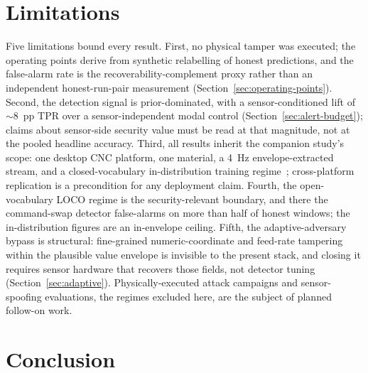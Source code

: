 \documentclass[sensors,article,submit,moreauthors,pdftex]{Definitions/mdpi}
\begin{document}
\section{Limitations}
\label{sec:limitations}

Five limitations bound every result. First, no physical tamper was executed; the operating points derive from synthetic relabelling of honest predictions, and the false-alarm rate is the recoverability-complement proxy rather than an independent honest-run-pair measurement (Section~\ref{sec:operating-points}). Second, the detection signal is prior-dominated, with a sensor-conditioned lift of $\sim\!8$~pp TPR over a sensor-independent modal control (Section~\ref{sec:alert-budget}); claims about sensor-side security value must be read at that magnitude, not at the pooled headline accuracy. Third, all results inherit the companion study's scope: one desktop CNC platform, one material, a 4~Hz envelope-extracted stream, and a closed-vocabulary in-distribution training regime~\cite{decoder_paper}; cross-platform replication is a precondition for any deployment claim. Fourth, the open-vocabulary LOCO regime is the security-relevant boundary, and there the command-swap detector false-alarms on more than half of honest windows; the in-distribution figures are an in-envelope ceiling. Fifth, the adaptive-adversary bypass is structural: fine-grained numeric-coordinate and feed-rate tampering within the plausible value envelope is invisible to the present stack, and closing it requires sensor hardware that recovers those fields, not detector tuning (Section~\ref{sec:adaptive}). Physically-executed attack campaigns and sensor-spoofing evaluations, the regimes excluded here, are the subject of planned follow-on work.

\section{Conclusion}
\label{sec:conclusion}
\end{document}
